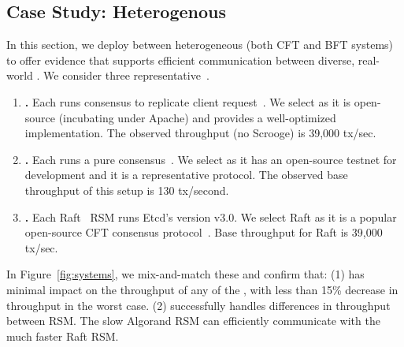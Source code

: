 \subsection{Case Study: Heterogenous }
In this section, we deploy \Scrooge{} between heterogeneous  (both CFT and BFT systems) to offer evidence that
\Scrooge{} supports efficient communication between diverse, real-world . 
We consider three representative~.
\begin{enumerate}
    \item {\bf \ResDB{}.}
    Each \ResDB{} \RSM{} runs \pbft{} consensus to replicate  client request~\cite{resilientdb,vldb-demo,suyash-phd-thesis}.
    We select \ResDB{} as it is open-source (incubating under Apache) and provides a well-optimized \pbft{} implementation. The observed throughput (no Scrooge) is 39,000 tx/sec.
    \item {\bf \Algo{}.}
    Each \Algo{} \RSM{} runs a pure \PoS{} consensus~\cite{algorand}.
    We select \Algo{} as it has an open-source testnet for development and it is a representative \PoS{} protocol. The observed base throughput of this setup is 130 tx/second.
    \item {\bf \Raft{}.}  Each Raft~\cite{raft} RSM runs Etcd's \Raft{} version v3.0. We select Raft as it is a popular open-source CFT consensus protocol~\cite{etcd-raft}. Base throughput for Raft is 39,000 tx/sec.
\end{enumerate}
In Figure~\ref{fig:systems}, we mix-and-match these  and confirm that: (1) \Scrooge{} has minimal impact on the throughput of any of the , with less than 15\% decrease in throughput in the worst case.
(2) \Scrooge{} successfully handles differences in throughput between RSM. The slow Algorand RSM can efficiently communicate with the much faster Raft RSM. 






